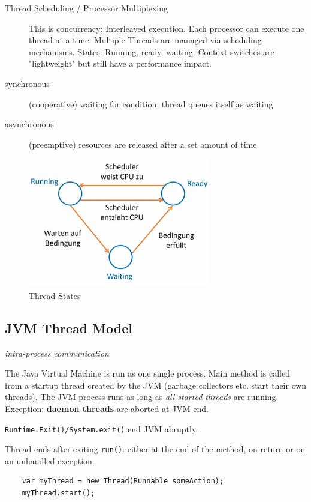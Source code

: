 \begin{description}
  \item[Thread Scheduling / Processor Multiplexing] This is concurrency: Interleaved execution. 
  Each processor can execute one thread at a time. Multiple Threads are managed via scheduling mechanisms.
  States: Running, ready, waiting.
  Context switches are "lightweight" but still have a performance impact.

  \item[synchronous] (cooperative) waiting for condition, thread queues itself as waiting
  \item[asynchronous] (preemptive) resources are released after a set amount of time
\end{description}

\begin{figure}[H]
  \centering
  \includegraphics[width=8cm]{res/01-thread-states.png}
  \caption{Thread States}
\end{figure}

\subsection{JVM Thread Model}

\emph{intra-process communication}

The Java Virtual Machine is run as one single process. Main method is called from a startup thread created by the JVM (garbage collectors etc. start their own threads).
The JVM process runs as long as \textit{all started threads} are running. Exception: \textbf{daemon threads} are aborted at JVM end.

\texttt{Runtime.Exit()/System.exit()} end JVM abruptly.

Thread ends after exiting \texttt{run()}: either at the end of the method, on return or on an unhandled exception.

  \begin{verbatim}
    var myThread = new Thread(Runnable someAction);
    myThread.start();
  \end{verbatim}

